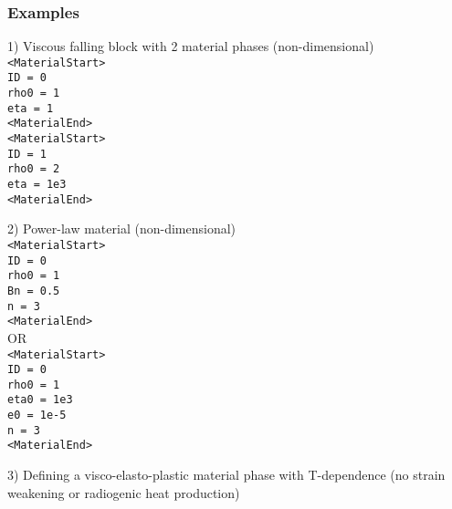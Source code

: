\documentclass[a4paper,11pt]{article}
\begin{document}
\subsubsection{Examples}

1) Viscous falling block with 2 material phases (non-dimensional)\\ 
{\small
\indent \texttt{<MaterialStart>}\\
\indent \indent \texttt{ID = 0}\\
\indent \indent \texttt{rho0 = 1}\\
\indent \indent \texttt{eta = 1}\\
\indent \texttt{<MaterialEnd>}\\

\indent \texttt{<MaterialStart>}\\
\indent \indent \texttt{ID = 1}\\
\indent \indent \texttt{rho0 = 2}\\
\indent \indent \texttt{eta = 1e3}\\
\indent \texttt{<MaterialEnd>}\\}

2) Power-law material (non-dimensional)\\ 
{\small
\indent \texttt{<MaterialStart>}\\
\indent \indent \texttt{ID = 0}\\
\indent \indent \texttt{rho0 = 1}\\
\indent \indent \texttt{Bn = 0.5}\\
\indent \indent \texttt{n = 3}\\
\indent \texttt{<MaterialEnd>}\\
\indent \indent OR\\
\indent \texttt{<MaterialStart>}\\
\indent \indent \texttt{ID = 0}\\
\indent \indent \texttt{rho0 = 1}\\
\indent \indent \texttt{eta0 = 1e3}\\
\indent \indent \texttt{e0 = 1e-5}\\
\indent \indent \texttt{n  = 3}\\
\indent \texttt{<MaterialEnd>}\\}

3) Defining a visco-elasto-plastic material phase with T-dependence (no strain weakening or radiogenic heat production)\\
\end{document}
